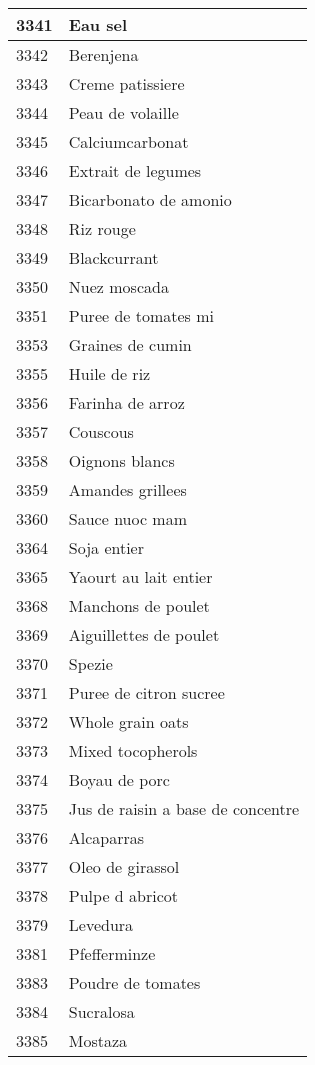 \begin{longtable}{|l|l|}
3341 & Eau sel \\ \hline 
3342 & Berenjena \\ \hline 
3343 & Creme patissiere \\ \hline 
3344 & Peau de volaille \\ \hline 
3345 & Calciumcarbonat \\ \hline 
3346 & Extrait de legumes \\ \hline 
3347 & Bicarbonato de amonio \\ \hline 
3348 & Riz rouge \\ \hline 
3349 & Blackcurrant \\ \hline 
3350 & Nuez moscada \\ \hline 
3351 & Puree de tomates mi \\ \hline 
3353 & Graines de cumin \\ \hline 
3355 & Huile de riz \\ \hline 
3356 & Farinha de arroz \\ \hline 
3357 & Couscous \\ \hline 
3358 & Oignons blancs \\ \hline 
3359 & Amandes grillees \\ \hline 
3360 & Sauce nuoc mam \\ \hline 
3364 & Soja entier \\ \hline 
3365 & Yaourt au lait entier \\ \hline 
3368 & Manchons de poulet \\ \hline 
3369 & Aiguillettes de poulet \\ \hline 
3370 & Spezie \\ \hline 
3371 & Puree de citron sucree \\ \hline 
3372 & Whole grain oats \\ \hline 
3373 & Mixed tocopherols \\ \hline 
3374 & Boyau de porc \\ \hline 
3375 & Jus de raisin a base de concentre \\ \hline 
3376 & Alcaparras \\ \hline 
3377 & Oleo de girassol \\ \hline 
3378 & Pulpe d abricot \\ \hline 
3379 & Levedura \\ \hline 
3381 & Pfefferminze \\ \hline 
3383 & Poudre de tomates \\ \hline 
3384 & Sucralosa \\ \hline 
3385 & Mostaza \\ \hline 

\end{longtable}
